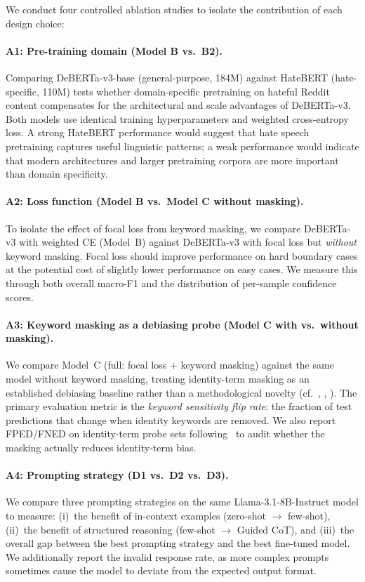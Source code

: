 \documentclass[10pt,a4paper]{article}
\begin{document}
We conduct four controlled ablation studies to isolate the contribution of each design choice:

\paragraph{A1: Pre-training domain (Model B vs.\ B2).}
Comparing DeBERTa-v3-base (general-purpose, 184M) against HateBERT (hate-specific, 110M) tests whether domain-specific pretraining on hateful Reddit content compensates for the architectural and scale advantages of DeBERTa-v3. Both models use identical training hyperparameters and weighted cross-entropy loss. A strong HateBERT performance would suggest that hate speech pretraining captures useful linguistic patterns; a weak performance would indicate that modern architectures and larger pretraining corpora are more important than domain specificity.

\paragraph{A2: Loss function (Model B vs.\ Model C without masking).}
To isolate the effect of focal loss from keyword masking, we compare DeBERTa-v3 with weighted CE (Model~B) against DeBERTa-v3 with focal loss but \emph{without} keyword masking. Focal loss should improve performance on hard boundary cases at the potential cost of slightly lower performance on easy cases. We measure this through both overall macro-F1 and the distribution of per-sample confidence scores.

\paragraph{A3: Keyword masking as a debiasing probe (Model C with vs.\ without masking).}
We compare Model~C (full: focal loss + keyword masking) against the same model without keyword masking, treating identity-term masking as an established debiasing baseline rather than a methodological novelty (cf.~\citet{park2018reducing}, \citet{kennedy2020contextualizing}, \citet{pisterzi2023debiasing}). The primary evaluation metric is the \emph{keyword sensitivity flip rate}: the fraction of test predictions that change when identity keywords are removed. We also report FPED/FNED on identity-term probe sets following~\citet{dixon2018measuring} to audit whether the masking actually reduces identity-term bias.

\paragraph{A4: Prompting strategy (D1 vs.\ D2 vs.\ D3).}
We compare three prompting strategies on the same Llama-3.1-8B-Instruct model to measure: (i)~the benefit of in-context examples (zero-shot $\rightarrow$ few-shot), (ii)~the benefit of structured reasoning (few-shot $\rightarrow$ Guided CoT), and (iii)~the overall gap between the best prompting strategy and the best fine-tuned model. We additionally report the invalid response rate, as more complex prompts sometimes cause the model to deviate from the expected output format.
\end{document}
